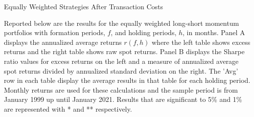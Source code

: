 \documentclass{article}
\begin{document}
\begin{table}[htpb!]
  \centering
  \caption{Equally Weighted Strategies After Transaction Costs}
  Reported below are the results for the equally weighted long-short momentum portfolios with formation periods, $f$, and holding periods, $h$, in months. Panel A displays the annualized average returns $r(f,h)$ where the left table shows excess returns and the right table shows raw spot returns. Panel B displays the Sharpe ratio values for excess returns on the left and a measure of annualized average spot returns divided by annualized standard deviation on the right. The 'Avg' row in each table display the average results in that table for each holding period. Monthly returns are used for these calculations and the sample period is from January 1999 up until January 2021. Results that are significant to 5\% and 1\% are represented with * and ** respectively.
  \begin{adjustwidth}{-1.5cm}{}
  

\end{adjustwidth}
\end{table}
\end{document}
